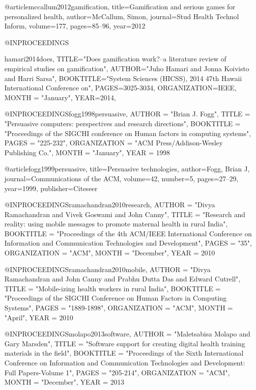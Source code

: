 @article{mccallum2012gamification,
  title={Gamification and serious games for personalized health},
  author={McCallum, Simon},
  journal={Stud Health Technol Inform},
  volume={177},
  pages={85--96},
  year={2012}
}


@INPROCEEDINGS{hamari2014does,
  TITLE="Does gamification work?--a literature review of empirical studies on gamification",
  AUTHOR="Juho Hamari and Jonna Koivisto and Harri Sarsa",
  BOOKTITLE="System Sciences (HICSS), 2014 47th Hawaii International Conference on",
  PAGES={3025-3034},
  ORGANIZATION={IEEE},
  MONTH = "January",
  YEAR={2014},

}

@INPROCEEDINGS{fogg1998persuasive,
	AUTHOR = "Brian J. Fogg",
	TITLE = "Persuasive computers: perspectives and research directions",
	BOOKTITLE = "Proceedings of the SIGCHI conference on Human factors in computing systems",
	PAGES = "225-232",
	ORGANIZATION = "ACM Press/Addison-Wesley Publishing Co.",
	MONTH = "January", 
	YEAR = {1998}	}
	
	
@article{fogg1999persuasive,
  title={Persuasive technologies},
  author={Fogg, Brian J},
  journal={Communications of the ACM},
  volume={42},
  number={5},
  pages={27--29},
  year={1999},
  publisher={Citeseer}
}


@INPROCEEDINGS{ramachandran2010research,
	AUTHOR = "Divya Ramachandran and Vivek Goswami and John Canny",
	TITLE = "Research and reality: using mobile messages to promote maternal health in rural India",
	BOOKTITLE = "Proceedings of the 4th ACM/IEEE International Conference on Information and Communication Technologies and Development",
	PAGES = "35",
	ORGANIZATION = "ACM",
	MONTH = "December", 
	YEAR = {2010}	}

@INPROCEEDINGS{ramachandran2010mobile,
	AUTHOR = "Divya Ramachandran and John Canny and Prabhu Dutta Das and Edward Cutrell",
	TITLE = "Mobile-izing health workers in rural India",
	BOOKTITLE = "Proceedings of the SIGCHI Conference on Human Factors in Computing Systems",
	PAGES = "1889-1898",
	ORGANIZATION = "ACM",
	MONTH = "April", 
	YEAR = {2010}	}

@INPROCEEDINGS{molapo2013software,
	AUTHOR = "Maletsabisa Molapo and Gary Marsden",
	TITLE = "Software support for creating digital health training materials in the field",
	BOOKTITLE = "Proceedings of the Sixth International Conference on Information and Communication Technologies and Development: Full Papers-Volume 1",
	PAGES = "205-214",
	ORGANIZATION = "ACM",
	MONTH = "December", 
	YEAR = {2013}	}

